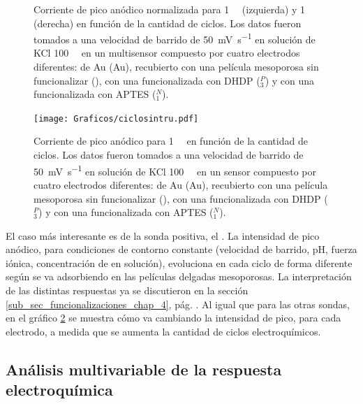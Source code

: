 \begin{figure}[h!]
\begin{subfigure}[t]{0.495\textwidth}
			\end{subfigure}
		      	\caption[Corriente de pico de \fc\space y \fe\space en función del número de ciclos]{Corriente de pico anódico normalizada para \fc\space \SI{1}{\milli\Molar} (izquierda) y  \fe\space \SI{1}{\milli\Molar} (derecha) en función de la cantidad de ciclos. Los datos fueron tomados a una velocidad de barrido de \SI{50}{\milli\volt\per\second} en solución de KCl \SI{100}{\milli\Molar} en un multisensor compuesto por cuatro electrodos diferentes: de Au (Au), recubierto con una película mesoporosa sin funcionalizar (\pdmZ), con una funcionalizada con DHDP (\pdmZ$^P_3$) y con una funcionalizada con APTES (\pdmZ$^N_1$).}
		      	\label{fig:ciclos-fe-fcoh}
		      	\end{figure}

		     \begin{figure}[b!]
		 	       	\begin{center}
		 	       	\texttt{[image: Graficos/ciclosintru.pdf]}
		        	\caption[Corriente de pico de \ru\space en función del número de ciclos]{Corriente de pico anódico para \ru\space \SI{1}{\milli\Molar} en función de la cantidad de ciclos. Los datos fueron tomados a una velocidad de barrido de \SI{50}{\milli\volt\per\second} en solución de KCl \SI{100}{\milli\Molar} en un sensor compuesto por cuatro electrodos diferentes: de Au (Au), recubierto con una película mesoporosa sin funcionalizar (\pdmZ), con una funcionalizada con DHDP (\pdmZ$^P_3$) y con una funcionalizada con APTES (\pdmZ$^N_1$).}
		         	\label{fig:ruciclos}
		         	\end{center}
		     		\end{figure}

	    El caso más interesante es de la sonda positiva, el \ru. La intensidad de pico anódico, para condiciones de contorno constante (velocidad de barrido, pH, fuerza iónica, concentración de \ru\space en solución), evoluciona en cada ciclo de forma diferente según se va adsorbiendo en las películas delgadas mesoporosas. La interpretación de las distintas respuestas ya se discutieron en la sección \ref{sub_sec_funcionalizaciones_chap_4}, pág. \pageref{sub_sec_funcionalizaciones_chap_4}. Al igual que para las otras sondas, en el gráfico \ref{fig:ruciclos}  se muestra cómo va cambiando la intensidad de pico, para cada electrodo, a medida que se aumenta la cantidad de ciclos electroquímicos. 

	\subsection{Análisis multivariable de la respuesta electroquímica}	     		

